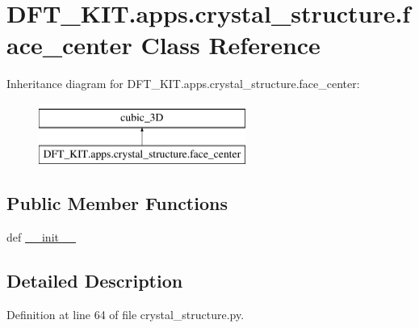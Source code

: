 \hypertarget{class_d_f_t___k_i_t_1_1apps_1_1crystal__structure_1_1face__center}{\section{D\+F\+T\+\_\+\+K\+I\+T.\+apps.\+crystal\+\_\+structure.\+face\+\_\+center Class Reference}
\label{class_d_f_t___k_i_t_1_1apps_1_1crystal__structure_1_1face__center}
}
Inheritance diagram for D\+F\+T\+\_\+\+K\+I\+T.\+apps.\+crystal\+\_\+structure.\+face\+\_\+center\+:\begin{figure}[H]
\begin{center}
\leavevmode
\includegraphics[height=2.000000cm]{class_d_f_t___k_i_t_1_1apps_1_1crystal__structure_1_1face__center}
\end{center}
\end{figure}
\subsection*{Public Member Functions}
\begin{DoxyCompactItemize}
\item 
def \hyperlink{class_d_f_t___k_i_t_1_1apps_1_1crystal__structure_1_1face__center_a8c00236923b634233a4c8d7c479ca620}{\+\_\+\+\_\+init\+\_\+\+\_\+}
\end{DoxyCompactItemize}


\subsection{Detailed Description}


Definition at line 64 of file crystal\+\_\+structure.\+py.



